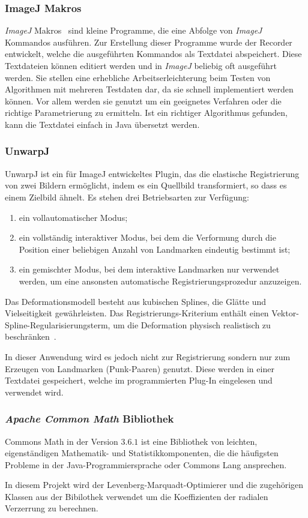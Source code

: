 \subsubsection{ImageJ Makros}	
\textit{ImageJ} Makros~\cite{JMacros} sind kleine Programme, die eine Abfolge von \textit{ImageJ} Kommandos ausführen. Zur Erstellung dieser Programme wurde der Recorder entwickelt, welche die ausgeführten Kommandos als Textdatei abspeichert. Diese Textdateien können editiert werden und in \textit{ImageJ} beliebig oft ausgeführt werden. Sie stellen eine erhebliche Arbeitserleichterung beim Testen von Algorithmen mit mehreren Testdaten dar, da sie schnell implementiert werden können. Vor allem werden sie genutzt um ein geeignetes Verfahren oder die richtige Parametrierung zu ermitteln. Ist ein richtiger Algorithmus gefunden, kann die Textdatei einfach in Java übersetzt werden.


\subsubsection{UnwarpJ}

UnwarpJ ist ein für ImageJ entwickeltes Plugin, das die elastische Registrierung von zwei Bildern ermöglicht, indem es ein Quellbild transformiert, so dass es einem Zielbild ähnelt. 
Es stehen drei Betriebsarten zur Verfügung: 

\begin{enumerate}
\item ein vollautomatischer Modus; 
\item ein vollständig interaktiver Modus, bei dem die Verformung durch die Position einer beliebigen Anzahl von Landmarken eindeutig bestimmt ist; 
\item ein gemischter Modus, bei dem interaktive Landmarken nur verwendet werden, um eine ansonsten automatische Registrierungsprozedur anzuzeigen.
\end{enumerate}

Das Deformationsmodell besteht aus kubischen Splines, die Glätte und Vielseitigkeit gewährleisten. Das Registrierungs-Kriterium enthält einen Vektor-Spline-Regularisierungsterm, um die Deformation physisch realistisch zu beschränken~\cite{unwrapj}.

In dieser Anwendung wird es jedoch nicht zur Registrierung sondern nur zum Erzeugen von Landmarken (Punk-Paaren) genutzt. Diese werden in einer Textdatei gespeichert, welche im programmierten Plug-In eingelesen und verwendet wird.

\subsubsection{\textit{Apache Common Math} Bibliothek}

Commons Math in der Version $3.6.1$ ist eine Bibliothek von leichten, eigenständigen Mathematik- und Statistikkomponenten, die die häufigsten Probleme in der Java-Programmiersprache oder Commons Lang ansprechen.
\cite{appache}

In diesem Projekt wird der Levenberg-Marquadt-Optimierer und die zugehörigen Klassen aus der Bibilothek verwendet um die Koeffizienten der radialen Verzerrung zu berechnen.
